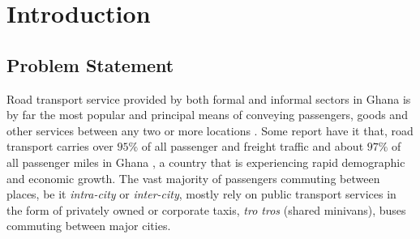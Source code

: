

\chapter{Introduction}

\ifpdf
    \graphicspath{{1_introduction/figures/PNG/}{1_introduction/figures/PDF/}{1_introduction/figures/}}
\else
    \graphicspath{{1_introduction/figures/EPS/}{1_introduction/figures/}}
\fi





\section{Problem Statement}
Road transport service provided by both formal and informal sectors in Ghana is by far the most popular and principal means of conveying passengers, goods and other services between any two or more locations \citep{aidoo_passengers_2013}. Some report have it that, road transport carries over $ 95\% $ of all passenger and freight traffic and about $ 97\% $ of all passenger miles in Ghana \citep[p.~195]{unesco_transportation:_????}, a country that is experiencing rapid demographic and economic growth. The vast majority of passengers commuting between places, be it \textit{intra-city} or \textit{inter-city}, mostly rely on public transport services in the form of privately owned or corporate taxis, \textit{tro tros} (shared minivans), buses commuting between major cities.

